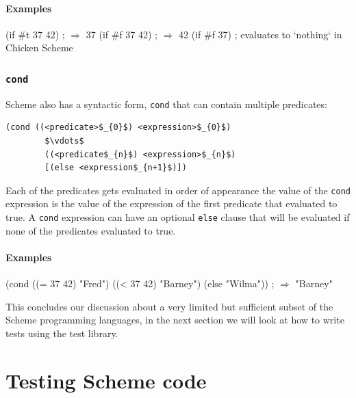 \documentclass[12pt,a4paper,english,twoside]{article}
\begin{document}
\paragraph{Examples}
\begin{schemecode}
(if #t 37 42) ; $\Rightarrow$ 37
(if #f 37 42) ; $\Rightarrow$ 42
(if #f 37) ; evaluates to `nothing` in Chicken Scheme
\end{schemecode}
\subsubsection{\texttt{cond}}
Scheme also has a syntactic form, \texttt{cond} that can contain multiple 
predicates:
\begin{lstlisting}[mathescape]
  (cond ((<predicate>$_{0}$) <expression>$_{0}$) 
        $\vdots$ 
        ((<predicate$_{n}$) <expression>$_{n}$) 
        [(else <expression$_{n+1}$)])
\end{lstlisting}
Each of the predicates gets evaluated in order of appearance the value of the 
\texttt{cond} expression is the value of the expression of the first predicate 
that evaluated to true. A \texttt{cond} expression can have an optional 
\texttt{else} clause that will be evaluated if none of the predicates 
evaluated to true.
\paragraph{Examples}
\begin{schemecode}
(cond ((= 37 42) "Fred")
      ((< 37 42) "Barney")
      (else "Wilma")) ; $\Rightarrow$ "Barney"
\end{schemecode}
This concludes our discussion about a very limited but sufficient subset of 
the Scheme programming languages, in the next section we will look at how to 
write tests using the test library.
\section{Testing Scheme code}
\end{document}
